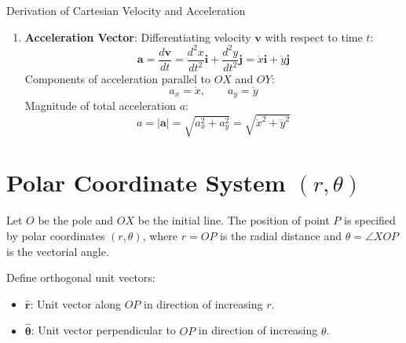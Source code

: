 \begin{proofbox}{Derivation of Cartesian Velocity and Acceleration}
\begin{enumerate}[leftmargin=1.5em]
    \item \textbf{Acceleration Vector}:
    Differentiating velocity $\mathbf{v}$ with respect to time $t$:
    \begin{equation}
        \mathbf{a} = \frac{d\mathbf{v}}{dt} = \frac{d^2x}{dt^2} \mathbf{i} + \frac{d^2y}{dt^2} \mathbf{j} = \ddot{x} \mathbf{i} + \ddot{y} \mathbf{j}
    \end{equation}
    Components of acceleration parallel to $OX$ and $OY$:
    \begin{equation}
        a_x = \ddot{x}, \qquad a_y = \ddot{y}
    \end{equation}
    Magnitude of total acceleration $a$:
    \begin{equation}
        a = |\mathbf{a}| = \sqrt{a_x^2 + a_y^2} = \sqrt{\ddot{x}^2 + \ddot{y}^2}
    \end{equation}
\end{enumerate}
\end{proofbox}

\section{Polar Coordinate System $(r, \theta)$}

Let $O$ be the pole and $OX$ be the initial line. The position of point $P$ is specified by polar coordinates $(r, \theta)$, where $r = OP$ is the radial distance and $\theta = \angle XOP$ is the vectorial angle.

Define orthogonal unit vectors:
\begin{itemize}
    \item $\hat{\mathbf{r}}$: Unit vector along $OP$ in direction of increasing $r$.
    \item $\hat{\boldsymbol{\theta}}$: Unit vector perpendicular to $OP$ in direction of increasing $\theta$.
\end{itemize}

